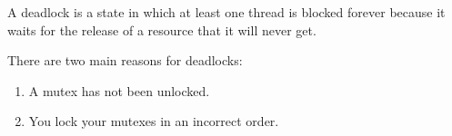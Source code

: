 A deadlock is a state in which at least one thread is blocked forever because it waits for the release of a resource that it will never get.

There are two main reasons for deadlocks:

\begin{enumerate}
\item 
A mutex has not been unlocked.

\item 
You lock your mutexes in an incorrect order.
\end{enumerate}
